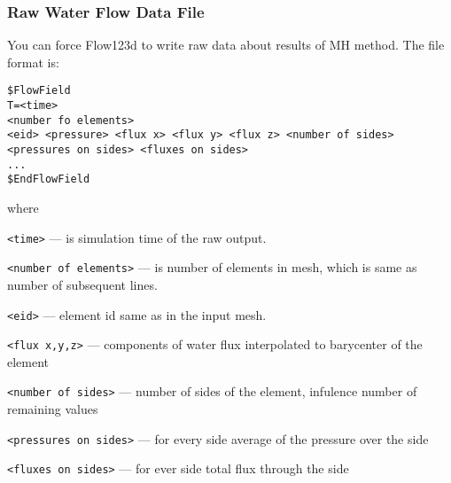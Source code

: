 \subsubsection{Raw Water Flow Data File}
You can force Flow123d to write raw data about results of MH method. The file format is:
\begin{verbatim}
$FlowField
T=<time>
<number fo elements>
<eid> <pressure> <flux x> <flux y> <flux z> <number of sides> <pressures on sides> <fluxes on sides> 
...
$EndFlowField
\end{verbatim}

where 
\begin{description}
 \item \verb'<time>' --- is simulation time of the raw output.
 \item \verb'<number of elements>' --- is number of elements in mesh, which is same as number of subsequent lines.
 \item \verb'<eid>' --- element id same as in the input mesh.
 \item \verb'<flux x,y,z>' --- components of water flux interpolated to barycenter of the element
 \item \verb'<number of sides>' --- number of sides of the element, infulence number of remaining values
 \item \verb'<pressures on sides>' --- for every side average of the pressure over the side
 \item \verb'<fluxes on sides>' --- for ever side total flux through the side 
\end{description}

